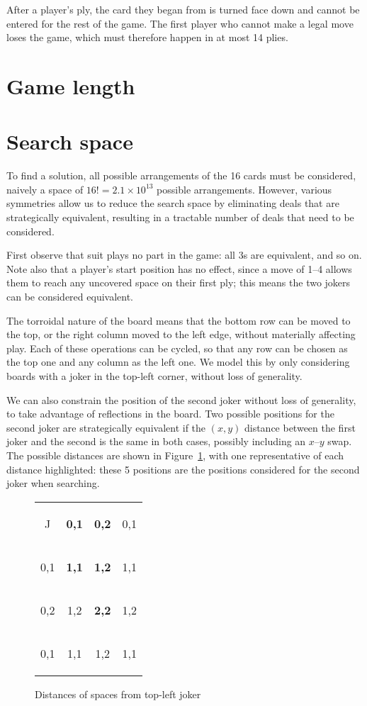 \documentclass[a4paper, twocolumn]{article}
\newcommand\card[1]{\begin{tcolorbox}#1\end{tcolorbox}}
\begin{document}
After a player's ply, the card they began from is turned face down and cannot
be entered for the rest of the game. The first player who cannot make a legal
move loses the game, which must therefore happen in at most 14 plies.


\section{Game length}




\section{Search space}

To find a solution, all possible arrangements of the 16 cards must be
considered, naively a space of $16! = 2.1 \times 10^{13}$ possible
arrangements. However, various symmetries allow us to reduce the search space by
eliminating deals that are strategically equivalent, resulting in a tractable
number of deals that need to be considered.

First observe that suit plays no part in the game: all 3s are equivalent, and so
on. Note also that a player's start position has no effect, since a move of 1--4
allows them to reach any uncovered space on their first ply; this means the two
jokers can be considered equivalent.

The torroidal nature of the board means that the bottom row can be moved to the
top, or the right column moved to the left edge, without materially affecting
play. Each of these operations can be cycled, so that any row can be chosen as
the top one and any column as the left one. We model this by only considering
boards with a joker in the top-left corner, without loss of generality.

We can also constrain the position of the second joker without loss of
generality, to take advantage of reflections in the board. Two possible
positions for the second joker are strategically equivalent if the $(x, y)$
distance between the first joker and the second is the same in both cases,
possibly including an $x$--$y$ swap. The possible distances are shown in
Figure~\ref{fig:joker-distances}, with one representative of each distance
highlighted: these 5 positions are the positions considered for the second joker
when searching.

\begin{figure}[h]
  \centering
  \begin{tabular}{c c c c}
    \card{J} & \card{\textbf{0,1}} & \card{\textbf{0,2}} & \card{0,1} \\
    \card{0,1} & \card{\textbf{1,1}} & \card{\textbf{1,2}} & \card{1,1} \\
    \card{0,2} & \card{1,2} & \card{\textbf{2,2}} & \card{1,2} \\
    \card{0,1} & \card{1,1} & \card{1,2} & \card{1,1}
  \end{tabular}

  \caption{Distances of spaces from top-left joker}
  \label{fig:joker-distances}
\end{figure}
\end{document}
